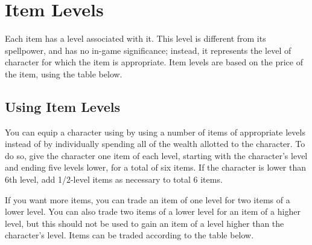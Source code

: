 \section{Item Levels}

Each item has a level associated with it. This level is different from its spellpower, and has no in-game significance; instead, it represents the level of character for which the item is appropriate. Item levels are based on the price of the item, using the table below.

\subsection{Using Item Levels}

You can equip a character using by using a number of items of appropriate levels instead of by individually spending all of the wealth allotted to the character. To do so, give the character one item of each level, starting with the character's level and ending five levels lower, for a total of six items. If the character is lower than 6th level, add 1/2-level items as necessary to total 6 items.

If you want more items, you can trade an item of one level for two items of a lower level. You can also trade two items of a lower level for an item of a higher level, but this should not be used to gain an item of a level higher than the character's level. Items can be traded according to the table below.

